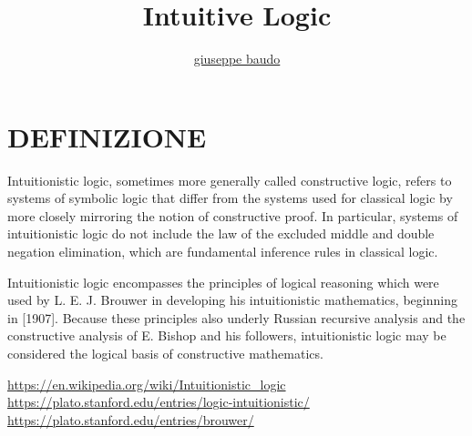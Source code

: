 \documentclass[a4paper,10pt]{article}
\title{Intuitive Logic}
\author{\href{http://www.baudo.hol.es}{giuseppe baudo}}
\begin{document}
\maketitle

\section{DEFINIZIONE}
Intuitionistic logic, sometimes more generally called constructive logic, refers to systems of symbolic logic that differ from the systems used for classical logic 
by more closely mirroring the notion of constructive proof. 
In particular, systems of intuitionistic logic do not include the law of the excluded middle and double negation elimination, 
which are fundamental inference rules in classical logic. \cite{k1}

Intuitionistic logic encompasses the principles of logical reasoning which were used by L. E. J. Brouwer in developing his intuitionistic mathematics, 
beginning in [1907]. Because these principles also underly Russian recursive analysis and the constructive analysis of E. Bishop and his followers, 
intuitionistic logic may be considered the logical basis of constructive mathematics. \cite{k2}


\begin{thebibliography}{100}
   \url{https://en.wikipedia.org/wiki/Intuitionistic_logic}
   \url{https://plato.stanford.edu/entries/logic-intuitionistic/}
   \url{https://plato.stanford.edu/entries/brouwer/}
\end{thebibliography}
\end{document}
